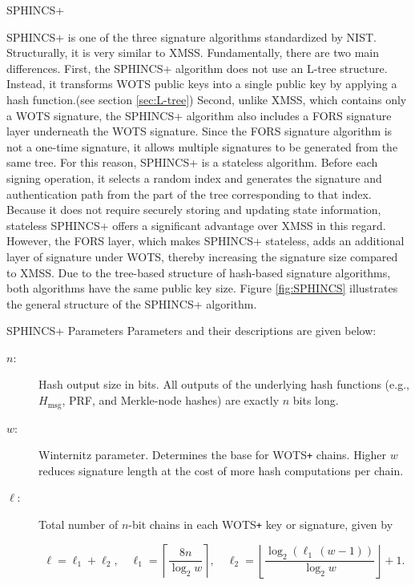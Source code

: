 \documentclass [version=submission]{iacrcc}
\begin{document}
\begin{section}{SPHINCS+}

    SPHINCS+ \cite{gaithersburgmdnist_2024_stateless} is one of the three signature algorithms standardized by NIST. Structurally, it is very similar to XMSS. Fundamentally, there are two main differences. First, the SPHINCS+ algorithm does not use an L-tree structure. Instead, it transforms WOTS public keys into a single public key by applying a hash function.(see section \ref{sec:L-tree}) Second, unlike XMSS, which contains only a WOTS signature, the SPHINCS+ algorithm also includes a FORS signature layer underneath the WOTS signature. Since the FORS signature algorithm is not a one-time signature, it allows multiple signatures to be generated from the same tree. For this reason, SPHINCS+ is a stateless algorithm. Before each signing operation, it selects a random index and generates the signature and authentication path from the part of the tree corresponding to that index. Because it does not require securely storing and updating state information, stateless SPHINCS+ offers a significant advantage over XMSS in this regard. However, the FORS layer, which makes SPHINCS+ stateless, adds an additional layer of signature under WOTS, thereby increasing the signature size compared to XMSS. Due to the tree-based structure of hash-based signature algorithms, both algorithms have the same public key size. Figure \ref{fig:SPHINCS} illustrates the general structure of the SPHINCS+ algorithm. 
    \begin{subsection}{SPHINCS+ Parameters}
        Parameters and their descriptions are given below: 
    \begin{description}
  \item[$n$:] Hash output size in bits. All outputs of the underlying hash functions (e.g., $H_{\mathrm{msg}}$, PRF, and Merkle-node hashes) are exactly $n$ bits long.
  
  \item[$w$:] Winternitz parameter. Determines the base for WOTS\texttt{+} chains.  
    Higher $w$ reduces signature length at the cost of more hash computations per chain.

  \item[$\ell$:] Total number of $n$-bit chains in each WOTS\texttt{+} key or signature, given by


\[
    \ell = \ell_1 + \ell_2,
    \quad
    \ell_1 = \left\lceil \frac{8n}{\log_2 w} \right\rceil,
    \quad
    \ell_2 = \left\lfloor \frac{\log_2(\ell_1\,(w-1))}{\log_2 w} \right\rfloor + 1.
  \]


\end{description}
\end{subsection}
\end{section}
\end{document}
